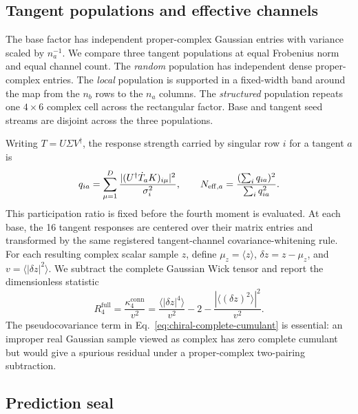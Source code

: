 \subsection{Tangent populations and effective channels}

The base factor has independent proper-complex Gaussian entries with variance scaled by $n_a^{-1}$.  We compare three tangent populations at equal Frobenius norm and equal channel count.  The \emph{random} population has independent dense proper-complex entries.  The \emph{local} population is supported in a fixed-width band around the map from the $n_b$ rows to the $n_a$ columns.  The \emph{structured} population repeats one $4\times6$ complex cell across the rectangular factor.  Base and tangent seed streams are disjoint across the three populations.

Writing $T=U\Sigma V^\dagger$, the response strength carried by singular row $i$ for a tangent $a$ is
\begin{equation}
 q_{ia}=\sum_{\mu=1}^{D}
 \frac{|(U^\dagger\dot T_aK)_{i\mu}|^2}{\sigma_i^2},
 \qquad
 N_{{\rm eff},a}=\frac{(\sum_i q_{ia})^2}{\sum_i q_{ia}^2}.
 \label{eq:chiral-neff}
\end{equation}
This participation ratio is fixed before the fourth moment is evaluated.  At each base, the 16 tangent responses are centered over their matrix entries and transformed by the same registered tangent-channel covariance-whitening rule.  For each resulting complex scalar sample $z$, define $\mu_z=\langle z\rangle$, $\delta z=z-\mu_z$, and $v=\langle|\delta z|^2\rangle$.  We subtract the complete Gaussian Wick tensor and report the dimensionless statistic
\begin{equation}
 R_4^{\mathrm{full}}
 =\frac{\kappa_4^{\mathrm{conn}}}{v^2}
 =\frac{\langle|\delta z|^4\rangle}{v^2}-2-
 \frac{|\langle(\delta z)^2\rangle|^2}{v^2}.
 \label{eq:chiral-complete-cumulant}
\end{equation}
The pseudocovariance term in Eq.~\eqref{eq:chiral-complete-cumulant} is essential: an improper real Gaussian sample viewed as complex has zero complete cumulant but would give a spurious residual under a proper-complex two-pairing subtraction.

\subsection{Prediction seal}


